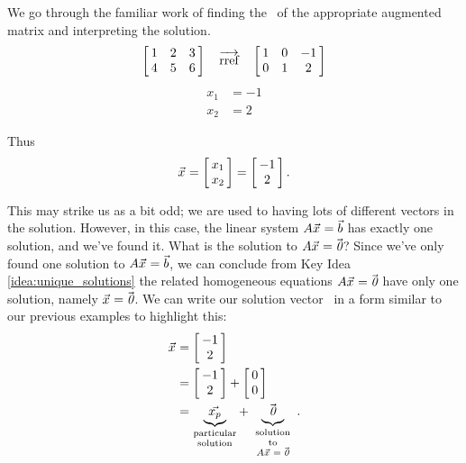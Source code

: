 {We go through the familiar work of finding the \rref\ of the appropriate augmented matrix and interpreting the solution. $$\bmx{ccc}1&2&3\\4&5&6\emx \quad \arref \quad \bmx{ccc}1&0&-1\\0&1&2\emx$$
\begin{align*} x_1 &= -1\\x_2 &= 2\end{align*}

Thus $$\vx = \bmx{c}x_1\\x_2\emx = \bmx{c}-1\\2\emx.$$

This may strike us as a bit odd; we are used to having lots of different vectors in the solution. However, in this case, the linear system $\tta\vx = \vb$ has exactly one solution, and we've found it. What is the solution to $\tta\vx=\zero$? Since we've only found one solution to $\tta\vx=\vb$, we can conclude from Key Idea \ref{idea:unique_solutions} the related homogeneous equations $\tta\vx=\zero$ have only one solution, namely $\vx = \zero$. We can write our solution vector \vx\ in a form similar to our previous examples to highlight this: \begin{align*}\vx &= \bmx{c}-1\\2\emx \\
&= \bmx{c}-1\\2\emx + \bmx{c}0\\0\emx\\
&= \underbrace{\vxp}_{\parbox{35pt}{\scriptsize \center {\vskip -10pt}particular solution}} + \underbrace{\zero_{ \parbox{1pt}{{\vskip 5pt}} }}_{\parbox{35pt}{\center \scriptsize {\vskip -10pt} solution to $\tta\vx=\zero$}}.
\end{align*} 
\ }\\ %

